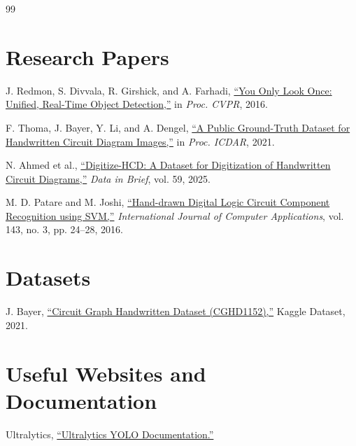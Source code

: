 \documentclass[12pt]{article}
\begin{document}
\newpage
{}
\begin{thebibliography}{99}

\makeatletter
\def\@biblabel#1{[#1]}
\makeatother

\section*{Research Papers}

J. Redmon, S. Divvala, R. Girshick, and A. Farhadi, 
\href{https://www.cv-foundation.org/openaccess/content_cvpr_2016/papers/Redmon_You_Only_Look_CVPR_2016_paper.pdf}
{``You Only Look Once: Unified, Real-Time Object Detection,''} 
in \textit{Proc. CVPR}, 2016.

F. Thoma, J. Bayer, Y. Li, and A. Dengel, 
\href{https://www.researchgate.net/publication/354357000_A_Public_Ground-Truth_Dataset_for_Handwritten_Circuit_Diagram_Images}
{``A Public Ground-Truth Dataset for Handwritten Circuit Diagram Images,''} 
in \textit{Proc. ICDAR}, 2021.

N. Ahmed et al., 
\href{https://www.researchgate.net/publication/388159586_Digitize-HCD_A_Dataset_for_Digitization_of_Handwritten_Circuit_Diagrams}
{``Digitize-HCD: A Dataset for Digitization of Handwritten Circuit Diagrams,''} 
\textit{Data in Brief}, vol. 59, 2025.

M. D. Patare and M. Joshi, 
\href{https://www.ijcaonline.org/archives/volume143/number3/patare-2016-ijca-910058.pdf}
{``Hand-drawn Digital Logic Circuit Component Recognition using SVM,''} 
\textit{International Journal of Computer Applications}, vol. 143, no. 3, pp. 24--28, 2016.

\section*{Datasets}

J. Bayer, 
\href{https://www.kaggle.com/datasets/johannesbayer/cghd1152/data}
{``Circuit Graph Handwritten Dataset (CGHD1152),''} 
Kaggle Dataset, 2021.



\section*{Useful Websites and Documentation}

Ultralytics, 
\href{https://docs.ultralytics.com/}
{``Ultralytics YOLO Documentation.''}


\end{thebibliography}
\end{document}
